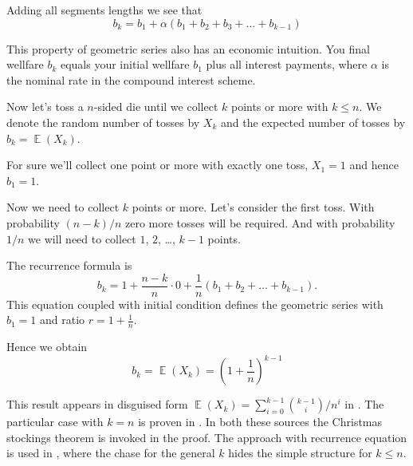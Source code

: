\documentclass{article}
\DeclareMathOperator{\E}{\mathbb{E}}
\begin{document}
Adding all segments lengths we see that
\[
b_{k} = b_1 + \alpha (b_1 + b_2 + b_3 + \ldots + b_{k-1})
\]

This property of geometric series also has an economic intuition. 
You final wellfare $b_k$ equals your initial wellfare $b_1$ plus all interest payments,
where $\alpha$ is the nominal rate in the compound interest scheme.


Now let's toss a $n$-sided die until we collect $k$ points or more with $k\leq n$.
We denote the random number of tosses by $X_k$ and the expected number of tosses 
by $b_k = \E(X_k)$. 

For sure we'll collect one point or more with exactly one toss, $X_1 = 1$ and hence $b_1 = 1$. 

Now we need to collect $k$ points or more. Let's consider the first toss.
With probability $(n - k)/n$ zero more tosses will be required. 
And with probability $1/n$ we will need to collect $1$, $2$, \ldots, $k-1$ points.

The recurrence formula is
\[
b_k = 1 + \frac{n - k}{n} \cdot 0 + \frac{1}{n} (b_1 + b_2 + \ldots + b_{k-1}).
\]
This equation coupled with initial condition defines the geometric series with $b_1 = 1$ and ratio $r = 1 + \frac{1}{n}$.

Hence we obtain
\[
b_k = \E(X_k) = \left( 1 + \frac{1}{n} \right)^{k-1}
\]


This result appears in disguised form $\E(X_k) = \sum_{i=0}^{k-1} \binom{k-1}{i} / n^i$ in \cite{conroy2021collection}.
The particular case with $k=n$ is proven in \cite{trevino2020expected}.
In both these sources the Christmas stockings theorem is invoked in the proof. 
The approach with recurrence equation is used in \cite{146114}, 
where the chase for the general $k$ hides the simple structure for $k\leq n$. 





\end{document}
